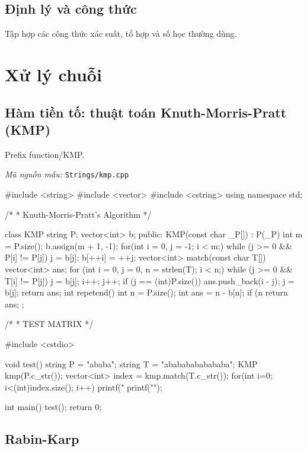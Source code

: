\documentclass[11pt]{article}
\newcommand{\codepath}[1]{\par\noindent\textit{Mã nguồn mẫu:} \texttt{#1}\par}
\begin{document}
\subsection{Định lý và công thức}

Tập hợp các công thức xác suất, tổ hợp và số học thường dùng.

\clearpage

\section{Xử lý chuỗi}

\subsection{Hàm tiền tố: thuật toán Knuth-Morris-Pratt (KMP)}

Prefix function/KMP.

\codepath{Strings/kmp.cpp}

\begingroup\scriptsize
\begin{vncode}
#include <string>
#include <vector>
#include <cstring>
using namespace std;

/*
 * Knuth-Morris-Pratt's Algorithm
 */

class KMP {
	string P;
	vector<int> b;
public:
	KMP(const char _P[]) : P(_P) {
		int m = P.size();
		b.assign(m + 1, -1);
		for(int i = 0, j = -1; i < m;) {
			while (j >= 0 && P[i] != P[j]) j = b[j];
			b[++i] = ++j;
		}
	}
	vector<int> match(const char T[]) {
		vector<int> ans;
		for (int i = 0, j = 0, n = strlen(T); i < n;) {
			while (j >= 0 && T[i] != P[j]) j = b[j];
			i++; j++;
			if (j == (int)P.size()) {
				ans.push_back(i - j);
				j = b[j];
			}
		}
		return ans;
	}
	int repetend() {
		int n = P.size();
		int ans = n - b[n];
		if (n %
		return ans;
	}
};

/*
 * TEST MATRIX
 */

#include <cstdio>

void test() {
	string P = "ababa";
	string T = "abababababababa";
	KMP kmp(P.c_str());
	vector<int> index = kmp.match(T.c_str());
	for(int i=0; i<(int)index.size(); i++) {
		printf("%
	}
	printf("\n");
}

int main() {
	test();
	return 0;
}
\end{vncode}
\endgroup


\subsection{Rabin-Karp}
\end{document}
